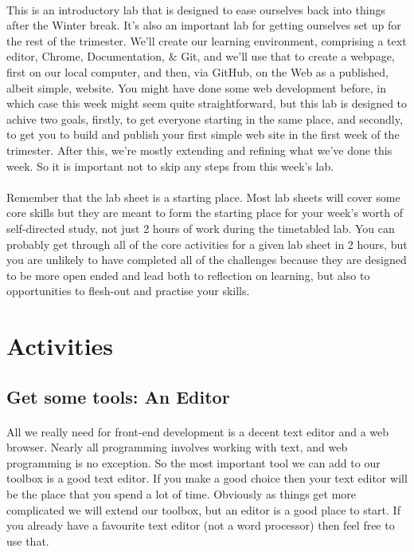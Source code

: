 \documentclass[10pt, a4paper]{article}
\begin{document}
\paragraph{} This is an introductory lab that is designed to ease ourselves back into things after the Winter break. It's also an important lab for getting ourselves set up for the rest of the trimester. We'll create our learning environment, comprising a text editor, Chrome, Documentation, \& Git, and we'll use that to create a webpage, first on our local computer, and then, via GitHub, on the Web as a published, albeit simple, website. You might have done some web development before, in which case this week might seem quite straightforward, but this lab is designed to achive two goals, firstly, to get everyone starting in the same place, and secondly, to get you to build and publish your first simple web site in the first week of the trimester. After this, we're mostly extending and refining what we've done this week. So it is important not to skip any steps from this week's lab.

\paragraph{} Remember that the lab sheet is a starting place. Most lab sheets will cover some core skills but they are meant to form the starting place for your week's worth of self-directed study, not just 2 hours of work during the timetabled lab. You can probably get through all of the core activities for a given lab sheet in 2 hours, but you are unlikely to have completed all of the challenges because they are designed to be more open ended and lead both to reflection on learning, but also to opportunities to flesh-out and practise your skills.

\section{Activities}

\subsection{Get some tools: An Editor}

\paragraph{} All we really need for front-end development is a decent text editor and a web browser. Nearly all programming involves working with text, and web programming is no exception. So the most important tool we can add to our toolbox is a good text editor. If you make a good choice then your text editor will be the place that you spend a lot of time. Obviously as things get more complicated we will extend our toolbox, but an editor is a good place to start. If you already have a favourite text editor (not a word processor) then feel free to use that.
\end{document}
